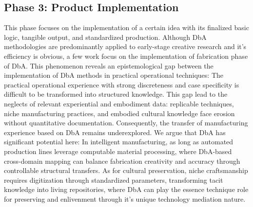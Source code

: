 \subsection{Phase 3: Product Implementation} 
This phase focuses on the implementation of a certain idea with its finalized basic logic, tangible output, and standardized production. Although DbA methodologies are predominantly applied to early-stage creative research and it's efficiency is obvious, a few work focus on the implementation of fabrication phase of DbA. This phenomenon reveals an epistemological gap between the implementation of DbA methods in practical operational techniques: The practical operational experience with strong discreteness and case specificity is difficult to be transformed into structured knowledge\cite{rigaud2022exploring}. This gap lead to the neglects of relevant experiential and embodiment data: replicable techniques\cite{schulz2014design}, niche manufacturing practices\cite{scopigno2017digital}, and embodied cultural knowledge\cite{vaisey2009motivation} face erosion without quantitative documentation. Consequently, the transfer of manufacturing experience based on DbA remains underexplored. We argue that DbA has significant potential here: In intelligent manufacturing, as long as automated production lines leverage computable material processing, where DbA-based cross-domain mapping can balance fabrication creativity and accuracy through controllable structural transfers\cite{schulz2014design}. As for cultural preservation, niche craftsmanship requires digitization through standardized parameters, transforming tacit knowledge into living repositories, where DbA can play the essence technique role for preserving and enlivenment through it's unique technology mediation nature\cite{scopigno2017digital, jiang2022data}.



